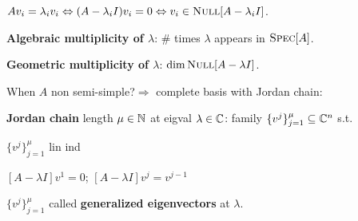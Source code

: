 \begin{Fact}
$Av_i=\lambda_iv_i\Leftrightarrow(A-\lambda_i I)v_i=0\Leftrightarrow v_i\in\textsc{Null}[A-\lambda_i I]$.
\end{Fact}
\begin{Definition}
\textbf{Algebraic multiplicity of $\lambda$}: \# times $\lambda$ appears in $\textsc{Spec}[A]$.

\textbf{Geometric multiplicity of $\lambda$}: $\dim\textsc{Null}[A-\lambda I]$.
\end{Definition}
When $A$ non semi-simple?$\Rightarrow$ complete basis with Jordan chain:

\begin{Definition}
\textbf{Jordan chain} length $\mu\in\mathbb N$ at eigval $\lambda\in\mathbb C$: family $\{v^j\}_{j=1}^\mu\subseteq\mathbb C^n$ s.t.
\begin{enumerate*}[label=\protect\circled{\arabic*}]
  \item $\{v^j\}_{j=1}^\mu$ lin ind
  \item $[A-\lambda I]v^1=0$; $[A-\lambda I]v^j=v^{j-1}$
\end{enumerate*}
\end{Definition}
\begin{Definition}
$\{v^j\}_{j=1}^\mu$ called \textbf{generalized eigenvectors} at $\lambda$.
\end{Definition}

